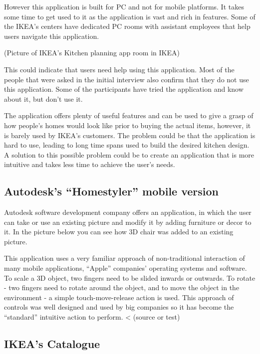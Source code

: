 However this application is built for PC and not for mobile platforms. It takes some time to get used to it as the application is vast and rich in features. Some of the IKEA’s centers have dedicated PC rooms with assistant employees that help users navigate this application. 

(Picture of IKEA’s Kitchen planning app room in IKEA)

This could indicate that users need help using this application. Most of the people that were asked in the initial interview also confirm that they do not use this application. Some of the participants have tried the application and know about it, but don’t use it.

The application offers plenty of useful features and can be used to give a grasp of how people’s homes would look like prior to buying the actual items, however, it is barely used by IKEA’s customers. The problem could be that the application is hard to use, leading to long time spans used to build the desired kitchen design. A solution to this possible problem could be to create an application that is more intuitive and takes less time to achieve the user’s needs.

\subsection{Autodesk’s “Homestyler” mobile version}

Autodesk software development company offers an application, in which the user can take or use an existing picture and modify it by adding furniture or decor to it. In the picture below you can see how 3D chair was added to an existing picture.  




This application uses a very familiar approach of non-traditional interaction of many mobile applications, “Apple” companies’ operating systems and software. To scale a 3D object, two fingers need to be slided inwards or outwards. To rotate - two fingers need to rotate around the object, and to move the object in the environment - a simple touch-move-release action is used. This approach of controls was well designed and used by big companies so it has become the “standard” intuitive action to perform. < (source or test)





\subsection{IKEA’s Catalogue}

